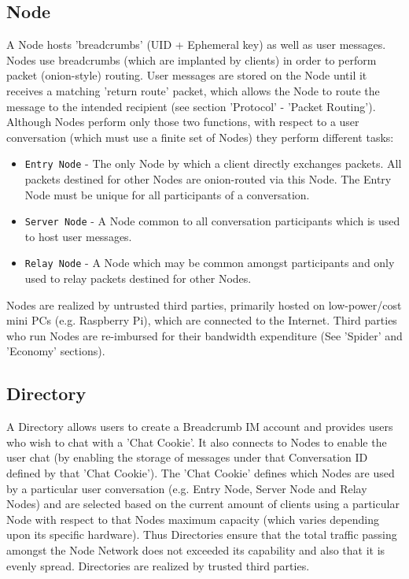 \documentclass{article}
\begin{document}
\subsection{Node}
A Node hosts 'breadcrumbs' (UID + Ephemeral key) as well as user messages. Nodes use breadcrumbs (which are implanted by clients) in order to perform packet (onion-style) routing. User
messages are stored on the Node until it receives a matching 'return route' packet, which allows the Node to route the message to the intended recipient 
(see section 'Protocol' - 'Packet Routing'). Although Nodes perform only those two functions, with respect to a user conversation (which must use a finite set of Nodes) they
perform different tasks:
\begin{itemize}
	\item \texttt{Entry Node} - The only Node by which a client directly exchanges packets. All packets destined for other Nodes are onion-routed via this Node.
The Entry Node must be unique for all participants of a conversation.
	\item \texttt{Server Node} - A Node common to all conversation participants which is used to host user messages.
	\item \texttt{Relay Node} - A Node which may be common amongst participants and only used to relay packets destined for other Nodes.
\end{itemize}
Nodes are realized by untrusted third parties, primarily hosted on low-power/cost mini PCs (e.g. Raspberry Pi), which are connected to the Internet. 
Third parties who run Nodes are re-imbursed for their bandwidth expenditure (See 'Spider' and 'Economy' sections).

\subsection{Directory}
A Directory allows users to create a Breadcrumb IM account and provides users who wish to chat with a 'Chat Cookie'. It also connects to Nodes to enable the user chat (by enabling 
the storage of messages under that Conversation ID defined by that 'Chat Cookie'). The 'Chat Cookie' defines which Nodes are used by a particular user conversation (e.g. Entry Node, Server Node and Relay Nodes) and are
selected based on the current amount of clients using a particular Node with respect to that Nodes maximum capacity (which varies depending upon its specific hardware). Thus
Directories ensure that the total traffic passing amongst the Node Network does not exceeded its capability and also that it is evenly spread.
Directories are realized by trusted third parties.
\end{document}
